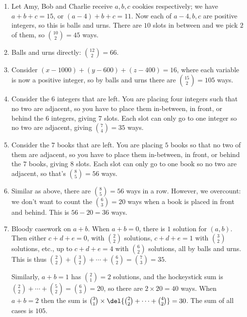 \documentclass[10pt,paper=letter]{scrartcl}
\begin{document}
\begin{enumerate}

\item Let Amy, Bob and Charlie receive $a, b, c$ cookies respectively; we have $a + b + c = 15$, or $(a - 4) + b + c = 11$. Now each of $a-4, b, c$ are positive integers, so this is balls and urns. There are $10$ slots in between and we pick $2$ of them, so $\binom{10}2 = 45$ ways.

\item Balls and urns directly: $\binom{12}2 = 66$.

\item Consider $(x - 1000) + (y - 600) + (z - 400) = 16$, where each variable is now a positive integer, so by balls and urns there are $\binom{15}2 = 105$ ways.

\item Consider the $6$ integers that are left. You are placing four integers such that no two are adjacent, so you have to place them in-between, in front, or behind the $6$ integers, giving $7$ slots. Each slot can only go to one integer so no two are adjacent, giving $\binom{7}4 = 35$ ways.

\item Consider the $7$ books that are left. You are placing $5$ books so that no two of them are adjacent, so you have to place them in-between, in front, or behind the $7$ books, giving $8$ slots. Each slot can only go to one book so no two are adjacent, so that's $\binom{8}{5} = 56$ ways.

\item Similar as above, there are $\binom{8}{5} = 56$ ways in a row. However, we overcount: we don't want to count the $\binom{6}{3} = 20$ ways when a book is placed in front and behind. This is $56 - 20 = 36$ ways.

\item Bloody casework on $a + b$. When $a + b = 0$, there is $1$ solution for $(a, b)$. Then either $c + d + e = 0$, with $\binom22$ solutions, $c + d + e = 1$ with $\binom32$ solutions, etc., up to $c + d + e = 4$ with $\binom62$ solutions, all by balls and urns. This is thus $\binom22 + \binom32 + \cdots + \binom62 = \binom73 = 35$.

Similarly, $a + b = 1$ has $\binom21 = 2$ solutions, and the hockeystick sum is $\binom22 + \cdots + \binom52 = \binom63 = 20$, so there are $2 \times 20 = 40$ ways. When $a + b = 2$ then the sum is $\binom31 \times \del{\binom22 + \cdots + \binom42} = 30$. The sum of all cases is $105$.

\end{enumerate}
\end{document}
